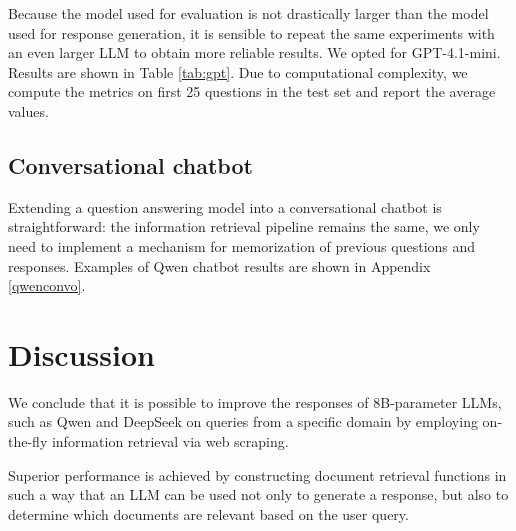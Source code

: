 \documentclass[fleqn,moreauthors,10pt]{ds_report}
\begin{document}
Because the model used for evaluation is not drastically larger than the model used for response generation, it is sensible to repeat the same experiments with an even larger LLM to obtain more reliable results. We opted for GPT-4.1-mini. Results are shown in Table \ref{tab:gpt}. Due to computational complexity, we compute the metrics on first 25 questions in the test set and report the average values. 



\subsection*{Conversational chatbot}

Extending a question answering model into a conversational chatbot is straightforward: the information retrieval pipeline remains the same, we only need to implement a mechanism for memorization of previous questions and responses. Examples of Qwen chatbot results are shown in Appendix \ref{qwenconvo}.







\section*{Discussion}

We conclude that it is possible to improve the responses of 8B-parameter LLMs, such as Qwen and DeepSeek on queries from a specific domain by employing on-the-fly information retrieval via web scraping. 

Superior performance is achieved by constructing document retrieval functions in such a way that an LLM can be used not only to generate a response, but also to determine which documents are relevant based on the user query. 
\end{document}
